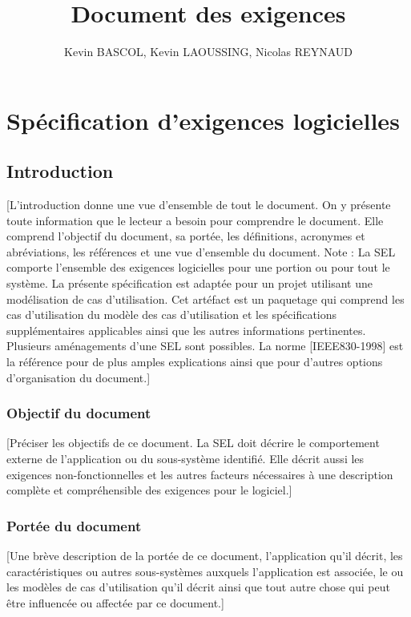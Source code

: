 \documentclass[10pt,a4paper]{report}
\author{Kevin BASCOL, Kevin LAOUSSING, Nicolas REYNAUD}
\title{Document des exigences}
\begin{document}
\maketitle
\newpage
\setcounter{secnumdepth}{4}
\setcounter{tocdepth}{4}
\renewcommand{\contentsname}{Sommaire}
\tableofcontents
\newpage

\chapter*{Spécification d'exigences logicielles}

\section{Introduction}
[L’introduction donne une vue d’ensemble de tout le document. On y présente toute information que le lecteur a besoin pour  comprendre le document. Elle comprend l’objectif du document, sa portée, les définitions, acronymes et abréviations, les références et une vue d’ensemble du document.
Note : La SEL comporte l’ensemble des exigences logicielles pour une portion ou pour tout le système. La présente spécification est adaptée pour  un projet utilisant une modélisation de cas d’utilisation. Cet artéfact est un paquetage qui comprend les cas d’utilisation du modèle des cas d’utilisation et les spécifications supplémentaires applicables ainsi que les autres informations pertinentes.
Plusieurs aménagements d’une SEL sont possibles. La norme [IEEE830-1998] est la référence pour de plus amples explications ainsi que pour d’autres options d’organisation du document.]

\subsection{Objectif du document}
[Préciser les objectifs de ce document. La SEL doit décrire le comportement externe de l’application ou du sous-système identifié. Elle décrit aussi les exigences non-fonctionnelles et les autres facteurs nécessaires à une description complète et compréhensible des exigences pour le logiciel.]

\subsection{Portée du document}
[Une brève description de la portée de ce document, l’application qu’il décrit, les caractéristiques ou autres sous-systèmes auxquels l’application est associée, le ou les modèles de cas d’utilisation qu’il décrit ainsi que tout autre chose qui peut être influencée ou affectée par ce document.]
\end{document}
